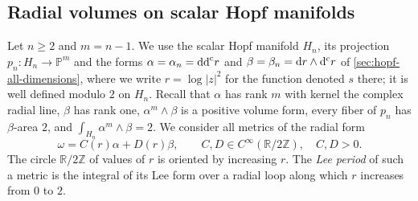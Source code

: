 \subsection{Radial volumes on scalar Hopf manifolds}
\label{subsec:radial-gauduchon-lck-volumes}

Let $n\geq2$ and $m=n-1$. We use the scalar Hopf manifold $H_n$, its projection $p_n\colon H_n\to\mathbb P^m$ and the forms $\alpha=\alpha_n=\mathrm{dd}^{\mathrm{c}} r$ and $\beta=\beta_n=\mathrm dr\wedge\mathrm d^{\mathrm c} r$ of \cref{sec:hopf-all-dimensions}, where we write $r=\log|z|^2$ for the function denoted $s$ there; it is well defined modulo $2$ on $H_n$. Recall that $\alpha$ has rank $m$ with kernel the complex radial line, $\beta$ has rank one, $\alpha^m\wedge\beta$ is a positive volume form, every fiber of $p_n$ has $\beta$-area $2$, and $\int_{H_n}\alpha^m\wedge\beta=2$. We consider all metrics of the radial form
\begin{equation}\label{eq:radial-lck-family}
 \omega=C(r)\alpha+D(r)\beta,\qquad
 C,D\in C^\infty(\mathbb R/2\mathbb Z),\quad C,D>0.
\end{equation}
The circle $\mathbb R/2\mathbb Z$ of values of $r$ is oriented by increasing $r$. The \emph{Lee period} of such a metric is the integral of its Lee form over a radial loop along which $r$ increases from $0$ to $2$.

